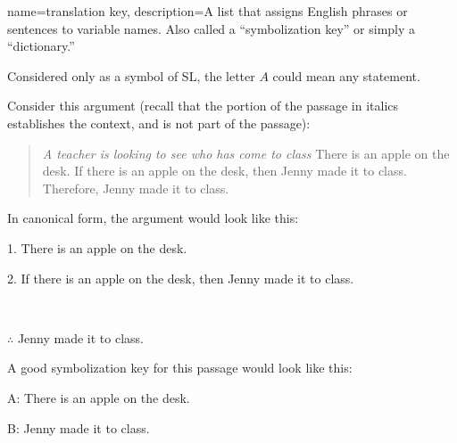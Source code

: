{
name=translation key,
description={A list that assigns English phrases or sentences to variable names. Also called a ``symbolization key''  or simply a ``dictionary.''}
}

Considered only as a symbol of SL, the letter $A$ could mean any statement. 

Consider this argument (recall that the portion of the passage in italics establishes the context, and is not part of the passage):

\begin{quotation}
\noindent \textit{A teacher is looking to see who has come to class} There is an apple on the desk. If there is an apple on the desk, then Jenny made it to class. Therefore, Jenny made it to class.
\end{quotation}

In canonical form, the argument would look like this:

\begin{earg}
\item[1.] There is an apple on the desk.
\item[2.] If there is an apple on the desk, then Jenny made it to class.
\item[] \textcolor{white}{.}\sout{\hspace{.8\linewidth}}\textcolor{white}{.} 
\item[$\therefore$] Jenny made it to class.
\end{earg}

A good symbolization key for this passage would look like this:

\begin{ekey}
\item[A:]There is an apple on the desk.
\item[B:]Jenny made it to class.
\end{ekey}


